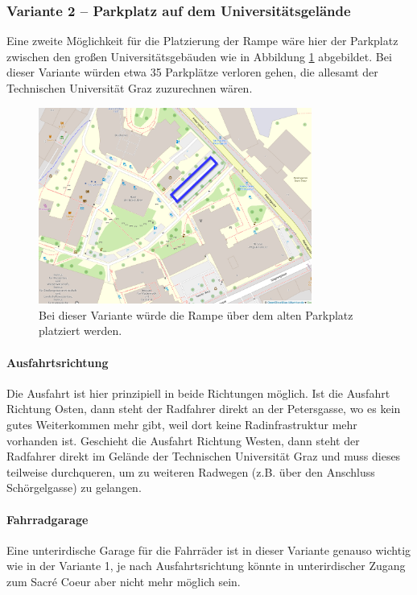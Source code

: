 \subsubsection{Variante 2 -- Parkplatz auf dem Universitätsgelände}
Eine zweite Möglichkeit für die Platzierung der Rampe wäre hier der Parkplatz zwischen den großen Universitätsgebäuden wie in Abbildung \ref{fig:zufahrt_neue_technik_v2} abgebildet. Bei dieser Variante würden etwa 35 Parkplätze verloren gehen, die allesamt der Technischen Universität Graz zuzurechnen wären.

\begin{figure}
    \centering
    \includegraphics[width=0.8\textwidth]{main/bike/tunnel/uni/zufahrt_neue_technik_v2}
    \caption[Zufahrt Parkplatz Neue Technik]{Bei dieser Variante würde die Rampe über dem alten Parkplatz platziert werden.}
    \label{fig:zufahrt_neue_technik_v2}
\end{figure}

\paragraph{Ausfahrtsrichtung}
Die Ausfahrt ist hier prinzipiell in beide Richtungen möglich. Ist die Ausfahrt Richtung Osten, dann steht der Radfahrer direkt an der Petersgasse, wo es kein gutes Weiterkommen mehr gibt, weil dort keine Radinfrastruktur mehr vorhanden ist. Geschieht die Ausfahrt Richtung Westen, dann steht der Radfahrer direkt im Gelände der Technischen Universität Graz und muss dieses teilweise durchqueren, um zu weiteren Radwegen (z.B. über den Anschluss Schörgelgasse) zu gelangen.

\paragraph{Fahrradgarage}
Eine unterirdische Garage für die Fahrräder ist in dieser Variante genauso wichtig wie in der Variante 1, je nach Ausfahrtsrichtung könnte in unterirdischer Zugang zum Sacré Coeur aber nicht mehr möglich sein.

